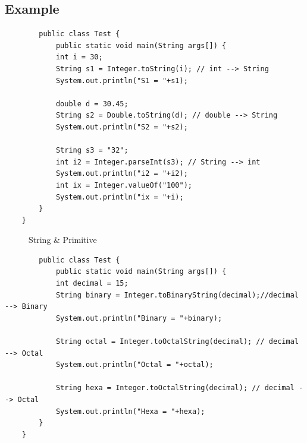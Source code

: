 \documentclass[openany]{book}  %
\begin{document}
\subsection{Example}
\begin{center}
    \begin{verbatim}
        public class Test {
            public static void main(String args[]) {
            int i = 30;
            String s1 = Integer.toString(i); // int --> String
            System.out.println("S1 = "+s1);

            double d = 30.45;
            String s2 = Double.toString(d); // double --> String
            System.out.println("S2 = "+s2);
            
            String s3 = "32";
            int i2 = Integer.parseInt(s3); // String --> int
            System.out.println("i2 = "+i2);
            int ix = Integer.valueOf("100");
            System.out.println("ix = "+i);
        }
    }
    \end{verbatim}
\end{center}
% 
% 
\begin{figure}[htbp]
    \begin{center}
        \caption{String \& Primitive}
    \end{center}
\end{figure}
\begin{center}
    \begin{verbatim}
        public class Test {
            public static void main(String args[]) {
            int decimal = 15;
            String binary = Integer.toBinaryString(decimal);//decimal --> Binary
            System.out.println("Binary = "+binary);

            String octal = Integer.toOctalString(decimal); // decimal --> Octal
            System.out.println("Octal = "+octal);

            String hexa = Integer.toOctalString(decimal); // decimal --> Octal
            System.out.println("Hexa = "+hexa);
        }
    }
    \end{verbatim}
\end{center}
% 
\end{document}
